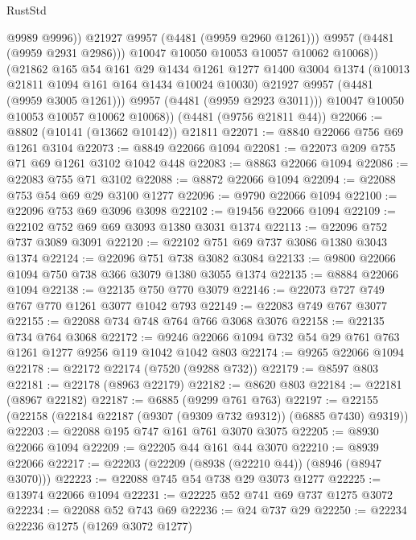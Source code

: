 \begin{lexlean}{RustStd}
\begin{coremodule}
                      @9989
                      @9996))
                  @21927
                  @9957
                  (@4481 (@9959 @2960 @1261)))
                @9957
                (@4481 (@9959 @2931 @2986)))
              @10047
              @10050
              @10053
              @10057
              @10062
              @10068))
          (@21862
            @165
            @54
            @161
            @29
            @1434
            @1261
            @1277
            @1400
            @3004
            @1374
            (@10013 @21811 @1094 @161 @164 @1434 @10024 @10030)
            @21927
            @9957
            (@4481 (@9959 @3005 @1261)))
          @9957
          (@4481 (@9959 @2923 @3011)))
        @10047
        @10050
        @10053
        @10057
        @10062
        @10068))
    (@4481 (@9756 @21811 @44))
@22066 := @8802 (@10141 (@13662 @10142)) @21811
@22071 := @8840 @22066 @756 @69 @1261 @3104
@22073 := @8849 @22066 @1094
@22081 := @22073 @209 @755 @71 @69 @1261 @3102 @1042 @448
@22083 := @8863 @22066 @1094
@22086 := @22083 @755 @71 @3102
@22088 := @8872 @22066 @1094
@22094 := @22088 @753 @54 @69 @29 @3100 @1277
@22096 := @9790 @22066 @1094
@22100 := @22096 @753 @69 @3096 @3098
@22102 := @19456 @22066 @1094
@22109 := @22102 @752 @69 @69 @3093 @1380 @3031 @1374
@22113 := @22096 @752 @737 @3089 @3091
@22120 := @22102 @751 @69 @737 @3086 @1380 @3043 @1374
@22124 := @22096 @751 @738 @3082 @3084
@22133 := @9800 @22066 @1094 @750 @738 @366 @3079 @1380 @3055 @1374
@22135 := @8884 @22066 @1094
@22138 := @22135 @750 @770 @3079
@22146 := @22073 @727 @749 @767 @770 @1261 @3077 @1042 @793
@22149 := @22083 @749 @767 @3077
@22155 := @22088 @734 @748 @764 @766 @3068 @3076
@22158 := @22135 @734 @764 @3068
@22172 := @9246 @22066 @1094 @732 @54 @29 @761 @763 @1261 @1277 @9256 @119 @1042 @1042 @803
@22174 := @9265 @22066 @1094
@22178 := @22172 @22174 (@7520 (@9288 @732))
@22179 := @8597 @803
@22181 := @22178 (@8963 @22179)
@22182 := @8620 @803
@22184 := @22181 (@8967 @22182)
@22187 := @6885 (@9299 @761 @763)
@22197 := @22155 (@22158 (@22184 @22187 (@9307 (@9309 @732 @9312)) (@6885 @7430) @9319))
@22203 := @22088 @195 @747 @161 @761 @3070 @3075
@22205 := @8930 @22066 @1094
@22209 := @22205 @44 @161 @44 @3070
@22210 := @8939 @22066
@22217 := @22203 (@22209 (@8938 (@22210 @44)) (@8946 (@8947 @3070)))
@22223 := @22088 @745 @54 @738 @29 @3073 @1277
@22225 := @13974 @22066 @1094
@22231 := @22225 @52 @741 @69 @737 @1275 @3072
@22234 := @22088 @52 @743 @69
@22236 := @24 @737 @29
@22250 := @22234
    @22236
    @1275
    (@1269 @3072 @1277)

\end{coremodule}
\end{lexlean}
